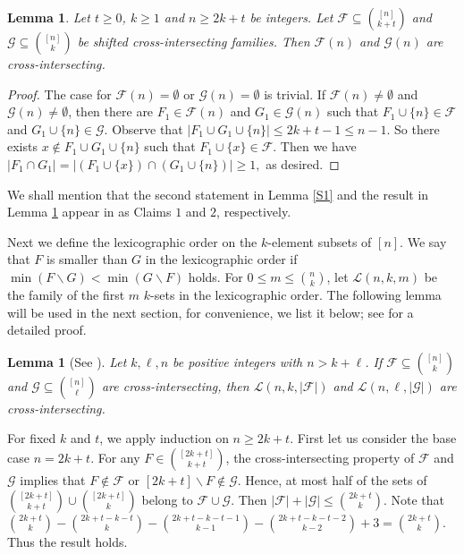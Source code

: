 \documentclass[11pt]{article}
\numberwithin{equation}{section}
\newtheorem{lemma}[theorem]{Lemma}
\begin{document}
\begin{lemma}\label{S4}
Let $t\ge 0$, $k\geq 1$ and $n \geq 2 k+t$ be integers.
Let $\mathcal{F} \subseteq\binom{[n]}{k+t}$ and $\mathcal{G} \subseteq\binom{[n]}{k}$ be shifted cross-intersecting families. Then $\mathcal{F}(n)$ and $\mathcal{G}(n)$ are cross-intersecting.
\end{lemma}
\begin{proof}
The case for $\mathcal{F}(n)=\emptyset$ or $\mathcal{G}(n)=\emptyset$ is trivial. If $\mathcal{F}(n)\neq\emptyset$ and $\mathcal{G}(n)\neq\emptyset$, then there are $F_1\in \mathcal{F}(n)$ and $G_1\in \mathcal{G}(n)$ such that $F_1\cup\{n\}\in \mathcal{F}$ and $G_1\cup\{n\}\in \mathcal{G}$.  Observe that
$
|F_1\cup G_1\cup\{n\}|\leq 2k+t-1\leq n-1.
$
So there exists $x\notin F_1\cup G_1\cup\{n\}$ such that $F_1\cup\{x\} \in \mathcal{F}$. Then we have
$
|F_1\cap G_1|=|(F_1\cup\{x\})\cap (G_1\cup\{n\})|\geq 1,
$
as desired.
\end{proof}

We shall mention that the second statement in Lemma \ref{S1} and the result in Lemma \ref{S4}  appear in \cite{F16} as Claims $1$ and $2$, respectively.


Next we define the lexicographic order on the $k$-element subsets of $[n]$. We say that $F$ is smaller than $G$ in the lexicographic order if $\min (F \backslash G)<\min (G \backslash F)$ holds. For $0\leq m\leq \binom{n}{k}$, let $\mathcal{L}(n, k, m)$ be the family of the first $m$ $k$-sets in the lexicographic order. 
The following lemma will be used in the next section, for convenience, we list it below;  
see \cite[p.266]{FK2017} for a detailed proof.

\begin{lemma}[See \cite{H76}] \label{Ln}
Let $k, \ell, n$ be positive integers with $n> k+\ell$. If $\mathcal{F} \subseteq\binom{[n]}{k}$ and $\mathcal{G} \subseteq\binom{[n]}{\ell}$ are cross-intersecting, then $\mathcal{L}(n, k,|\mathcal{F}|)$ and $\mathcal{L}(n, \ell,|\mathcal{G}|)$ are cross-intersecting.
\end{lemma}


For fixed $k$ and $t$, we apply induction on  $n\geq 2 k+t$.
First let us consider the base case $n=2 k+t$. For any $F \in\binom{[2k+t]}{k+t}$, the cross-intersecting property of $\mathcal{F}$ and $\mathcal{G}$ implies that $F \notin \mathcal{F}$ or $[2 k+t] \backslash F \notin \mathcal{G}$.
 Hence, at most half of the sets of $\binom{[2k+t]}{k+t}\cup \binom{[2k+t]}{k}$ belong to $\mathcal{F}\cup\mathcal{G}$.
Then
$|\mathcal{F}|+|\mathcal{G}| \leq\binom{2k+t}{k}$.
 Note that $\binom{2k+t}{k}-\binom{2k+t-k-t}{k}-\binom{2k+t-k-t-1}{k-1}-\binom{2k+t-k-t-2}{k-2}+3=\binom{2k+t}{k}$. Thus the result holds.
\end{document}
